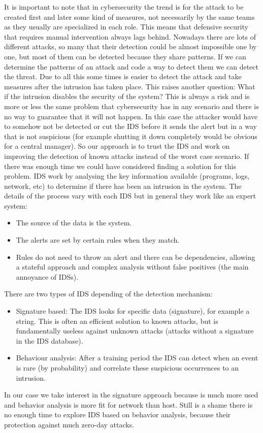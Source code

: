 \linej
\linej
It is important to note that in cybersecurity the trend is for the attack to be created first and later some kind of measures, not necessarily by the same teams as they usually are specialized in each role. This means that defensive security that requires manual intervention always lags behind.
\linej
Nowadays there are lots of different attacks, so many that their detection could be almost impossible one by one, but most of them can be detected because they share patterns. If we can determine the patterns of an attack and code a way to detect them we can detect the threat. Due to all this some times is easier to detect the attack and take measures after the intrusion has taken place.
\linej
This raises another question: What if the intrusion disables the security of the system?
\linej
This is always a risk and is more or less the same problem that cybersecurity has in any scenario and there is no way to guarantee that it will not happen. In this case the attacker would have to somehow not be detected or cut the IDS before it sends the alert but in a way that is not suspicious (for example shutting it down completely would be obvious for a central manager). So our approach is to trust the IDS and work on improving the detection of known attacks instead of the worst case scenario. If there was enough time we could have considered finding a solution for this problem.
\linej
\linej
IDS work by analysing the key information available (programs, logs, network, etc) to determine if there has been an intrusion in the system. The details of the process vary with each IDS but in general they work like an expert system:
\begin{itemize}
	\item The source of the data is the system.
	\item The alerts are set by certain rules when they match.
	\item Rules do not need to throw an alert and there can be dependencies, allowing a stateful approach and complex analysis without false positives (the main annoyance of IDSs).
\end{itemize}

\linej
There are two types of IDS depending of the detection mechanism:
\begin{itemize}
	\item Signature based: The IDS looks for specific data (signature), for example a string. This is often an efficient solution to known attacks, but is fundamentally useless against unknown attacks (attacks without a signature in the IDS database).
	\item Behaviour analysis: After a training period the IDS can detect when an event is rare (by probability) and correlate these suspicious occurrences to an intrusion.
\end{itemize}
In our case we take interest in the signature approach because is much more used and behavior analysis is more fit for network than host. Still is a shame there is no enough time to explore IDS based on behavior analysis, because their protection against much zero-day attacks.

